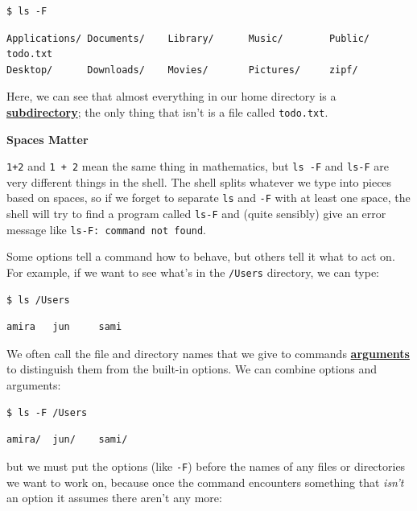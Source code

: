 \documentclass[
]{krantz}
\renewenvironment{quote}{\begin{VF}}{\end{VF}}
\newcommand{\gref}[2]{\hyperlink{#2}{\textbf{#1}}}
\begin{document}
\begin{verbatim}
$ ls -F
\end{verbatim}

\begin{verbatim}
Applications/ Documents/    Library/      Music/        Public/        todo.txt
Desktop/      Downloads/    Movies/       Pictures/     zipf/
\end{verbatim}

Here,
we can see that almost everything in our home directory is a \gref{subdirectory}{subdirectory};
the only thing that isn't is a file called \texttt{todo.txt}.

\begin{quote}
\textbf{Spaces Matter}

\texttt{1+2} and \texttt{1~+~2} mean the same thing in mathematics,
but \texttt{ls~-F} and \texttt{ls-F} are very different things in the shell.
The shell splits whatever we type into pieces based on spaces,
so if we forget to separate \texttt{ls} and \texttt{-F} with at least one space,
the shell will try to find a program called \texttt{ls-F} and (quite sensibly)
give an error message like \texttt{ls-F:\ command\ not\ found}.
\end{quote}

Some options tell a command how to behave,
but others tell it what to act on.
For example,
if we want to see what's in the \texttt{/Users} directory,
we can type:

\begin{verbatim}
$ ls /Users
\end{verbatim}

\begin{verbatim}
amira   jun     sami
\end{verbatim}

We often call the file and directory names that we give to commands \gref{arguments}{command\_line\_argument}
to distinguish them from the built-in options.
We can combine options and arguments:

\begin{verbatim}
$ ls -F /Users
\end{verbatim}

\begin{verbatim}
amira/  jun/    sami/
\end{verbatim}

but we must put the options (like \texttt{-F})
before the names of any files or directories we want to work on,
because once the command encounters something that \emph{isn't} an option
it assumes there aren't any more:
\end{document}
